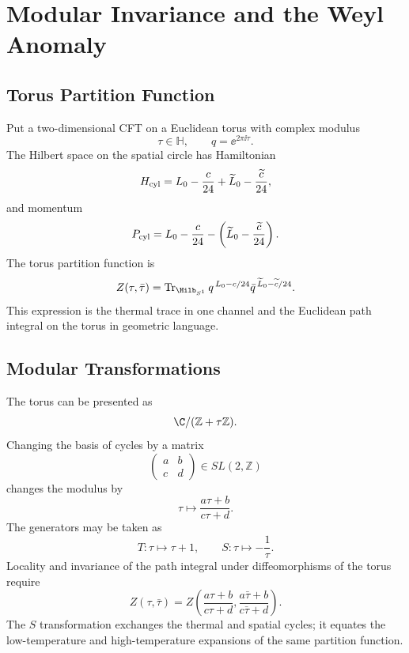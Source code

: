 \chapter{Modular Invariance and the Weyl Anomaly}
\label{ch:volume-iii-modular-invariance-weyl-anomaly}

\section{Torus Partition Function}

Put a two-dimensional CFT on a Euclidean torus with complex modulus
\[
  \tau\in\mathbb H,
  \qquad
  q=\ee^{2\pi\ii\tau}.
\]
The Hilbert space on the spatial circle has Hamiltonian
\[
  H_{\rm cyl}
  =
  L_0-\frac c{24}
  +
  \widetilde L_0-\frac{\widetilde c}{24},
\]
and momentum
\[
  P_{\rm cyl}
  =
  L_0-\frac c{24}
  -
  \left(\widetilde L_0-\frac{\widetilde c}{24}\right).
\]
The torus partition function is
\begin{equation}
  Z(\tau,\bar\tau)
  =
  \operatorname{Tr}_{\Hilb_{S^1}}
  q^{\,L_0-c/24}
  \bar q^{\,\widetilde L_0-\widetilde c/24}.
  \label{eq:torus-partition-function}
\end{equation}
This expression is the thermal trace in one channel and the Euclidean path
integral on the torus in geometric language.

\section{Modular Transformations}

The torus can be presented as
\[
  \C/(\mathbb Z+\tau\mathbb Z).
\]
Changing the basis of cycles by a matrix
\[
  \begin{pmatrix}
  a & b\\
  c & d
  \end{pmatrix}
  \in SL(2,\mathbb Z)
\]
changes the modulus by
\begin{equation}
  \tau\mapsto\frac{a\tau+b}{c\tau+d}.
  \label{eq:modular-action-tau}
\end{equation}
The generators may be taken as
\[
  T:\tau\mapsto\tau+1,
  \qquad
  S:\tau\mapsto-\frac1\tau .
\]
Locality and invariance of the path integral under diffeomorphisms of the
torus require
\begin{equation}
  Z(\tau,\bar\tau)
  =
  Z\left(\frac{a\tau+b}{c\tau+d},
          \frac{a\bar\tau+b}{c\bar\tau+d}\right).
  \label{eq:modular-invariance-partition-function}
\end{equation}
The \(S\) transformation exchanges the thermal and spatial cycles; it equates
the low-temperature and high-temperature expansions of the same partition
function.

